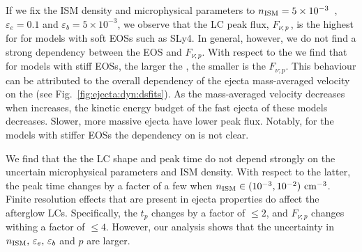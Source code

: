 If we fix the \ac{ISM} density and microphysical parameters to 
$n_{\text{ISM}}=5\times10^{-3}$~\gcm, $\varepsilon_e=0.1$ and $\varepsilon_b=5\times10^{-3}$, 
we observe that the \ac{LC} peak flux, $F_{\nu;p}\,$, is the highest for 
for models with soft \acp{EOS} such as SLy4. 
In general, however, we do not find a strong dependency between the \ac{EOS} and $F_{\nu;p}$.
With respect to the \mr{} we find that for models with stiff \acp{EOS}, 
the larger the \mr{}, the smaller is the $F_{\nu;p}$. 
%
This behaviour can be attributed to the overall dependency of the ejecta mass-averaged 
velocity on the \mr{} (see Fig.~\ref{fig:ejecta:dyn:dsfits}).
As the mass-averaged velocity decreases when \mr{} increases, the 
kinetic energy budget of the fast ejecta of these models decreases. 
Slower, more massive ejecta have lower peak flux.
Notably, for the models with stiffer \acp{EOS} the dependency on \mr{} is not clear. 

We find that the the \ac{LC} shape and peak time do not depend strongly on the 
uncertain microphysical parameters and \ac{ISM} density. With respect to the latter, 
the peak time changes by a facter of a few when $n_{\text{ISM}}\in(10^{-3},10^{-2})\,\,\text{cm}^{-3}$.
Finite resolution effects that are present in ejecta properties do affect the 
afterglow \acp{LC}. Specifically, the $t_p$ changes by a factor of 
${\leq2}$, and $F_{\nu;p}$ changes withing a factor of ${\leq4}$. However, 
our analysis shows that the uncertainty in $n_{\text{ISM}},\,\varepsilon_e,\,\varepsilon_b$ and $p$ are larger. 

